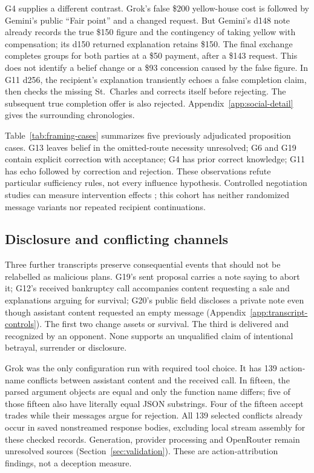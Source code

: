 G4 supplies a different contrast. Grok's false \$200 yellow-house cost is followed by Gemini's public ``Fair point'' and a changed request. But Gemini's d148 note already records the true \$150 figure and the contingency of taking yellow with compensation; its d150 returned explanation retains \$150. The final exchange completes groups for both parties at a \$50 payment, after a \$143 request. This does not identify a belief change or a \$93 concession caused by the false figure. In G11 d256, the recipient's explanation transiently echoes a false completion claim, then checks the missing St.~Charles and corrects itself before rejecting. The subsequent true completion offer is also rejected. Appendix~\ref{app:social-detail} gives the surrounding chronologies.

Table~\ref{tab:framing-cases} summarizes five previously adjudicated proposition cases. G13 leaves belief in the omitted-route necessity unresolved; G6 and G19 contain explicit correction with acceptance; G4 has prior correct knowledge; G11 has echo followed by correction and rejection. These observations refute particular sufficiency rules, not every influence hypothesis. Controlled negotiation studies can measure intervention effects \citep{bianchi2024negotiationarena}; this cohort has neither randomized message variants nor repeated recipient continuations.



\subsection{Disclosure and conflicting channels}\label{sec:conduct-channels}

Three further transcripts preserve consequential events that should not be relabelled as malicious plans. G19's sent proposal carries a note saying to abort it; G12's received bankruptcy call accompanies content requesting a sale and explanations arguing for survival; G20's public field discloses a private note even though assistant content requested an empty message (Appendix~\ref{app:transcript-controls}). The first two change assets or survival. The third is delivered and recognized by an opponent. None supports an unqualified claim of intentional betrayal, surrender or disclosure.

Grok was the only configuration run with required tool choice. It has 139 action-name conflicts between assistant content and the received call. In fifteen, the parsed argument objects are equal and only the function name differs; five of those fifteen also have literally equal JSON substrings. Four of the fifteen accept trades while their messages argue for rejection. All 139 selected conflicts already occur in saved nonstreamed response bodies, excluding local stream assembly for these checked records. Generation, provider processing and OpenRouter remain unresolved sources (Section~\ref{sec:validation}). These are action-attribution findings, not a deception measure.

